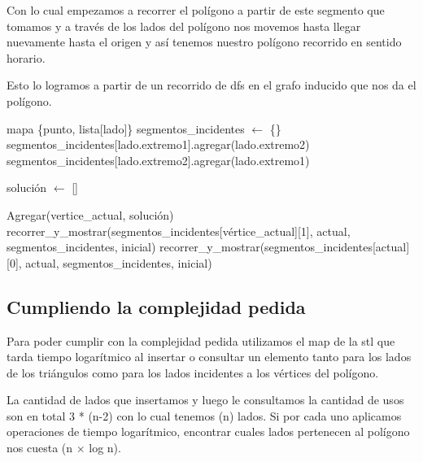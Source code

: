 Con lo cual empezamos a recorrer el polígono a partir de este segmento que tomamos y a través de los lados del polígono nos movemos hasta llegar nuevamente hasta el origen y así tenemos nuestro polígono recorrido en sentido horario.\newline    

Esto lo logramos a partir de un recorrido de dfs en el grafo inducido que nos da el polígono.\newline

\begin{algorithmic}

	\State mapa \{punto, lista[lado]\} segmentos_incidentes $\gets$ \{\}
		\State segmentos_incidentes[lado.extremo1].agregar(lado.extremo2)
		\State segmentos_incidentes[lado.extremo2].agregar(lado.extremo1)
	\EndFor 
\EndFunction
\end{algorithmic}


\begin{algorithmic}
\State solución $\gets$ []

	\State Agregar(vertice_actual, solución)
			\State recorrer_y_mostrar(segmentos_incidentes[vértice_actual][1], actual, segmentos_incidentes, inicial)
		\EndIf
	\Else
			\State recorrer_y_mostrar(segmentos_incidentes[actual][0], actual, segmentos_incidentes, inicial)
		\EndIf
	\EndIf
\EndFunction

\end{algorithmic}

\subsection{Cumpliendo la complejidad pedida}
Para poder cumplir con la complejidad pedida utilizamos el map de la stl que tarda tiempo logarítmico al insertar o consultar un elemento tanto para los lados de los triángulos como para los lados incidentes a los vértices del polígono.\newline

La cantidad de lados que insertamos y luego le consultamos la cantidad de usos son en total 3 * (n-2) con lo cual tenemos \bigo(n) lados. Si por cada uno aplicamos operaciones de tiempo logarítmico, encontrar cuales lados pertenecen al polígono nos cuesta \bigo(n $\times$ log n).\newline

